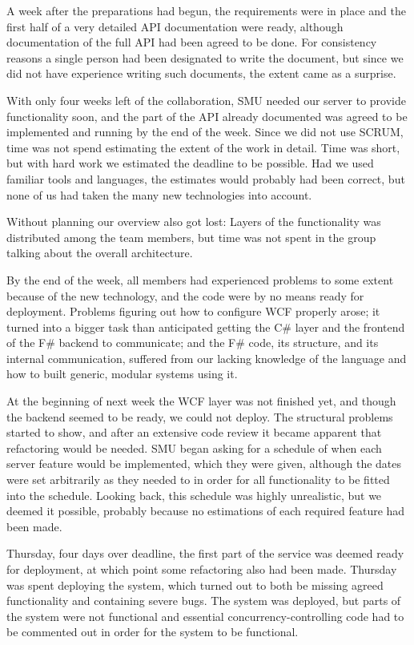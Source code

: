 A week after the preparations had begun, the requirements were in place and the first half of a very detailed API documentation were ready, although documentation of the full API had been agreed to be done. For consistency reasons a single person had been designated to write the document, but since we did not have experience writing such documents, the extent came as a surprise.

With only four weeks left of the collaboration, SMU needed our server to provide functionality soon, and the part of the API already documented was agreed to be implemented and running by the end of the week. Since we did not use SCRUM, time was not spend estimating the extent of the work in detail. Time was short, but with hard work we estimated the deadline to be possible.
Had we used familiar tools and languages, the estimates would probably had been correct, but none of us had taken the many new technologies into account.

Without planning our overview also got lost: Layers of the functionality was distributed among the team members, but time was not spent in the group talking about the overall architecture.

By the end of the week, all members had experienced problems to some extent because of the new technology, and the code were by no means ready for deployment.
Problems figuring out how to configure WCF properly arose; it turned into a bigger task than anticipated getting the C\# layer and the frontend of the F\# backend to communicate; and the F\# code, its structure, and its internal communication, suffered from our lacking knowledge of the language and how to built generic, modular systems using it.

At the beginning of next week the WCF layer was not finished yet, and though the backend seemed to be ready, we could not deploy. The structural problems started to show, and after an extensive code review it became apparent that refactoring would be needed.
SMU began asking for a schedule of when each server feature would be implemented, which they were given, although the dates were set arbitrarily as they needed to in order for all functionality to be fitted into the schedule. Looking back, this schedule was highly unrealistic, but we deemed it possible, probably because no estimations of each required feature had been made.

Thursday, four days over deadline, the first part of the service was deemed ready for deployment, at which point some refactoring also had been made. Thursday was spent deploying the system, which turned out to both be missing agreed functionality and containing severe bugs. The system was deployed, but parts of the system were not functional and essential concurrency-controlling code had to be commented out in order for the system to be functional.

